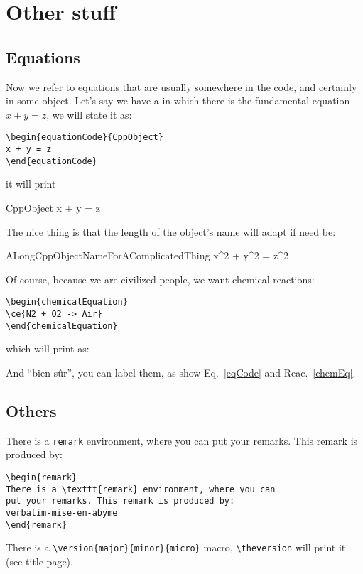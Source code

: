 \documentclass{documentation}
\begin{document}
\chapter{Other stuff}

\section{Equations}

Now we refer to equations that are usually somewhere in the
code, and certainly in some object. Let's say we have a
in which there is the fundamental equation
$x + y = z$, we will state it as:
\begin{verbatim}
\begin{equationCode}{CppObject}
x + y = z
\end{equationCode}
\end{verbatim}
it will print
\begin{equationCode}{CppObject}
x + y = z
\label{eqCode}
\end{equationCode}
The nice thing is that the length of the object's name will adapt
if need be:
\begin{equationCode}{ALongCppObjectNameForAComplicatedThing}
x^2 + y^2 = z^2
\end{equationCode}

Of course, because we are civilized people, we want chemical
reactions:
\begin{verbatim}
\begin{chemicalEquation}
\ce{N2 + O2 -> Air}
\end{chemicalEquation}
\end{verbatim}
which will print as:
\begin{chemicalEquation}
\label{chemEq}
\end{chemicalEquation}

And ``bien s\^ur'', you can label them, as show Eq.~\ref{eqCode} and
Reac.~\ref{chemEq}.

\section{Others}

\begin{remark}
There is a \texttt{remark} environment, where you can
put your remarks. This remark is produced by:
\begin{verbatim}
\begin{remark}
There is a \texttt{remark} environment, where you can
put your remarks. This remark is produced by:
verbatim-mise-en-abyme
\end{remark}
\end{verbatim}
\end{remark}


There is a \verb!\version{major}{minor}{micro}! macro,
\verb!\theversion! will print it (see title page).
\end{document}
